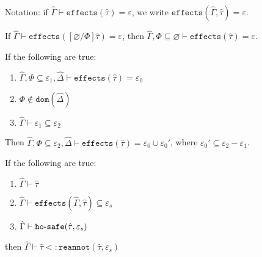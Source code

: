 \documentclass{llncs}
\newcommand{\keywadj}[1]{\mathtt{#1}}
\newcommand{\kwa}[1]{\keywadj{ #1 }}
\newcommand{\hyphen}{\hbox{-}}
\newcommand{\fx}[1]{ \kwa{effects}(#1) }
\newcommand{\hosafe}[2]{ \kwa{ho \hyphen safe}(#1, #2) }
\newcommand{\reannot}[2]{
	\keywadj{reannot}(#1, #2)
}
\begin{document}
\noindent
Notation: if $\hat \Gamma \vdash \fx{\hat \tau} = \varepsilon$, we write $\fx{\hat \Gamma, \hat \tau} = \varepsilon$.

\hrulefill

\begin{lemma}
If $\hat \Gamma \vdash \fx{[\varnothing/\Phi]\hat \tau} = \varepsilon$, then $\hat \Gamma, \Phi \subseteq \varnothing \vdash \fx{\hat \tau} = \varepsilon$.
\end{lemma}

\hrulefill

\begin{lemma} If the following are true:
\begin{enumerate}
	\item $\hat \Gamma, \Phi \subseteq \varepsilon_1, \hat \Delta \vdash \fx{\hat \tau} = \varepsilon_0$
	\item $\Phi \notin \kwa{dom}(\hat \Delta)$
	\item $\hat \Gamma \vdash \varepsilon_1 \subseteq \varepsilon_2$
\end{enumerate}

\noindent
Then $\hat \Gamma, \Phi \subseteq \varepsilon_2, \hat \Delta \vdash \fx{\hat \tau} = \varepsilon_0 \cup \varepsilon_0'$, where $\varepsilon_0' \subseteq \varepsilon_2 - \varepsilon_1$.


\end{lemma}

\hrulefill

\begin{lemma}[Approximation I]
If the following are true:
\begin{enumerate}
	\item $\hat \Gamma \vdash \hat \tau$
	\item $\hat \Gamma \vdash \fx{\hat \Gamma, \hat \tau} \subseteq \varepsilon_s$
	\item $\hat \Gamma \vdash \hosafe{\hat \tau}{\varepsilon_s}$
\end{enumerate}

\noindent
then $\hat \Gamma \vdash \hat \tau <: \reannot{\hat \tau}{\varepsilon_s}$

\end{lemma}
\end{document}
